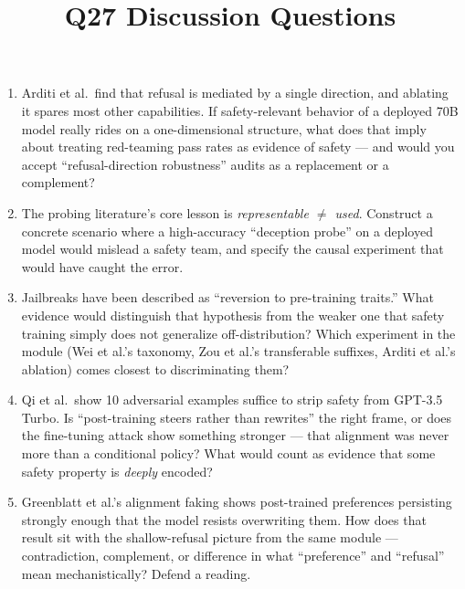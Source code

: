 \documentclass[11pt]{article}
\title{Q27 Discussion Questions}
\date{}
\begin{document}
\maketitle
\begin{enumerate}[noitemsep]
\item Arditi et al.\ find that refusal is mediated by a single direction, and ablating it spares most other capabilities. If safety-relevant behavior of a deployed 70B model really rides on a one-dimensional structure, what does that imply about treating red-teaming pass rates as evidence of safety --- and would you accept ``refusal-direction robustness'' audits as a replacement or a complement?
\item The probing literature's core lesson is \emph{representable $\neq$ used}. Construct a concrete scenario where a high-accuracy ``deception probe'' on a deployed model would mislead a safety team, and specify the causal experiment that would have caught the error.
\item Jailbreaks have been described as ``reversion to pre-training traits.'' What evidence would distinguish that hypothesis from the weaker one that safety training simply does not generalize off-distribution? Which experiment in the module (Wei et al.'s taxonomy, Zou et al.'s transferable suffixes, Arditi et al.'s ablation) comes closest to discriminating them?
\item Qi et al.\ show 10 adversarial examples suffice to strip safety from GPT-3.5 Turbo. Is ``post-training steers rather than rewrites'' the right frame, or does the fine-tuning attack show something stronger --- that alignment was never more than a conditional policy? What would count as evidence that some safety property is \emph{deeply} encoded?
\item Greenblatt et al.'s alignment faking shows post-trained preferences persisting strongly enough that the model resists overwriting them. How does that result sit with the shallow-refusal picture from the same module --- contradiction, complement, or difference in what ``preference'' and ``refusal'' mean mechanistically? Defend a reading.
\end{enumerate}
\end{document}
